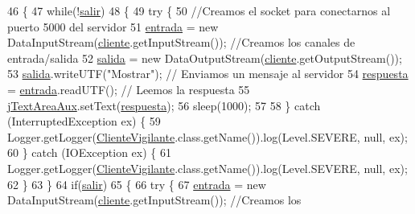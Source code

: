 \begin{DoxyCode}
46     \{
47         \textcolor{keywordflow}{while}(!\mbox{\hyperlink{classpecl6part2_1_1_cliente_vigilante_a79eb08097bb28efa5c33a168babe47e8}{salir}})
48         \{
49         \textcolor{keywordflow}{try} \{
50                \textcolor{comment}{//Creamos el socket para conectarnos al puerto 5000 del servidor}
51             \mbox{\hyperlink{classpecl6part2_1_1_cliente_vigilante_a499bca1b04f77132adcfa07ee2b9981c}{entrada}} = \textcolor{keyword}{new} DataInputStream(\mbox{\hyperlink{classpecl6part2_1_1_cliente_vigilante_a86ec03929e1c3324e42f83c4b49d0273}{cliente}}.getInputStream());  \textcolor{comment}{//Creamos los canales
       de entrada/salida}
52             \mbox{\hyperlink{classpecl6part2_1_1_cliente_vigilante_a2ae49bc25f90bbe7af39d0e8886345d3}{salida}} = \textcolor{keyword}{new} DataOutputStream(\mbox{\hyperlink{classpecl6part2_1_1_cliente_vigilante_a86ec03929e1c3324e42f83c4b49d0273}{cliente}}.getOutputStream());
53             \mbox{\hyperlink{classpecl6part2_1_1_cliente_vigilante_a2ae49bc25f90bbe7af39d0e8886345d3}{salida}}.writeUTF(\textcolor{stringliteral}{"Mostrar"});              \textcolor{comment}{// Enviamos un mensaje al servidor}
54             \mbox{\hyperlink{classpecl6part2_1_1_cliente_vigilante_ab9d336a0f81bb0be84e1b56a48f73f34}{respuesta}} = \mbox{\hyperlink{classpecl6part2_1_1_cliente_vigilante_a499bca1b04f77132adcfa07ee2b9981c}{entrada}}.readUTF();                  \textcolor{comment}{// Leemos la respuesta}
55             \mbox{\hyperlink{classpecl6part2_1_1_cliente_vigilante_a1a8bbb57af057f85a3d16d5371bd747f}{jTextAreaAux}}.setText(\mbox{\hyperlink{classpecl6part2_1_1_cliente_vigilante_ab9d336a0f81bb0be84e1b56a48f73f34}{respuesta}});
56             sleep(1000);
57             
58             \} \textcolor{keywordflow}{catch} (InterruptedException ex) \{
59             Logger.getLogger(\mbox{\hyperlink{classpecl6part2_1_1_cliente_vigilante_a2ba9f0dd667c95448bbbf3fe0cfccfcf}{ClienteVigilante}}.class.getName()).log(Level.SEVERE, null, ex);
60         \}  \textcolor{keywordflow}{catch} (IOException ex) \{
61                 Logger.getLogger(\mbox{\hyperlink{classpecl6part2_1_1_cliente_vigilante_a2ba9f0dd667c95448bbbf3fe0cfccfcf}{ClienteVigilante}}.class.getName()).log(Level.SEVERE, null, 
      ex);
62             \}
63         \}
64         \textcolor{keywordflow}{if}(\mbox{\hyperlink{classpecl6part2_1_1_cliente_vigilante_a79eb08097bb28efa5c33a168babe47e8}{salir}})
65             \{
66             \textcolor{keywordflow}{try} \{
67                 \mbox{\hyperlink{classpecl6part2_1_1_cliente_vigilante_a499bca1b04f77132adcfa07ee2b9981c}{entrada}} = \textcolor{keyword}{new} DataInputStream(\mbox{\hyperlink{classpecl6part2_1_1_cliente_vigilante_a86ec03929e1c3324e42f83c4b49d0273}{cliente}}.getInputStream());  \textcolor{comment}{//Creamos los
}
\end{DoxyCode}
